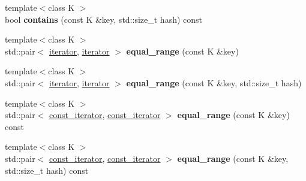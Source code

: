 \begin{DoxyCompactItemize}
{\footnotesize template$<$class K $>$ }\\bool {\bfseries contains} (const K \&key, std\+::size\+\_\+t hash) const
\item 
\mbox{\label{classtsl_1_1detail__ordered__hash_1_1ordered__hash_a6aa00375ff5f5938d6d3f21c8838a17a}} 
{\footnotesize template$<$class K $>$ }\\std\+::pair$<$ \mbox{\hyperlink{classtsl_1_1detail__ordered__hash_1_1ordered__hash_1_1ordered__iterator}{iterator}}, \mbox{\hyperlink{classtsl_1_1detail__ordered__hash_1_1ordered__hash_1_1ordered__iterator}{iterator}} $>$ {\bfseries equal\+\_\+range} (const K \&key)
\item 
\mbox{\label{classtsl_1_1detail__ordered__hash_1_1ordered__hash_abee808bc3adbdc3f9d5bb414f50def89}} 
{\footnotesize template$<$class K $>$ }\\std\+::pair$<$ \mbox{\hyperlink{classtsl_1_1detail__ordered__hash_1_1ordered__hash_1_1ordered__iterator}{iterator}}, \mbox{\hyperlink{classtsl_1_1detail__ordered__hash_1_1ordered__hash_1_1ordered__iterator}{iterator}} $>$ {\bfseries equal\+\_\+range} (const K \&key, std\+::size\+\_\+t hash)
\item 
\mbox{\label{classtsl_1_1detail__ordered__hash_1_1ordered__hash_a079645dc944987e6430ea66d32972860}} 
{\footnotesize template$<$class K $>$ }\\std\+::pair$<$ \mbox{\hyperlink{classtsl_1_1detail__ordered__hash_1_1ordered__hash_1_1ordered__iterator}{const\+\_\+iterator}}, \mbox{\hyperlink{classtsl_1_1detail__ordered__hash_1_1ordered__hash_1_1ordered__iterator}{const\+\_\+iterator}} $>$ {\bfseries equal\+\_\+range} (const K \&key) const
\item 
\mbox{\label{classtsl_1_1detail__ordered__hash_1_1ordered__hash_a2582c0867cdfd2bfc2e616bfe7c8e4a0}} 
{\footnotesize template$<$class K $>$ }\\std\+::pair$<$ \mbox{\hyperlink{classtsl_1_1detail__ordered__hash_1_1ordered__hash_1_1ordered__iterator}{const\+\_\+iterator}}, \mbox{\hyperlink{classtsl_1_1detail__ordered__hash_1_1ordered__hash_1_1ordered__iterator}{const\+\_\+iterator}} $>$ {\bfseries equal\+\_\+range} (const K \&key, std\+::size\+\_\+t hash) const

\end{DoxyCompactItemize}
